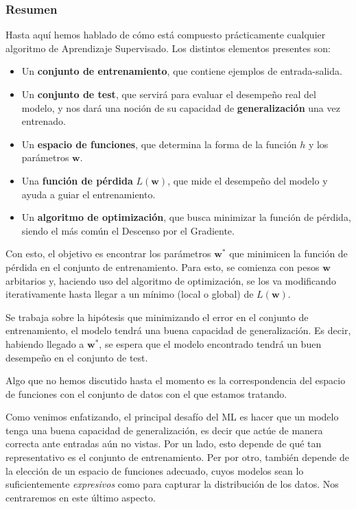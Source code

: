 \documentclass[../../main.tex]{subfiles}
\begin{document}
\subsubsection{Resumen}
Hasta aquí hemos hablado de cómo está compuesto prácticamente cualquier algoritmo de
Aprendizaje Supervisado. Los distintos elementos presentes son:
\begin{itemize}[noitemsep]
    \item Un \textbf{conjunto de entrenamiento}, que contiene ejemplos de entrada-salida.
    \item Un \textbf{conjunto de test}, que servirá para evaluar el desempeño real del modelo,
    y nos dará una noción de su capacidad de \textbf{generalización} una vez entrenado.
    \item Un \textbf{espacio de funciones}, que determina la forma de la función \(h\) y los
    parámetros \(\bm{w}\).
    \item Una \textbf{función de pérdida} \(L(\bm{w})\), que mide el desempeño del modelo
    y ayuda a guiar el entrenamiento.
    \item Un \textbf{algoritmo de optimización}, que busca minimizar la función de pérdida,
    siendo el más común el Descenso por el Gradiente.
\end{itemize}

Con esto, el objetivo es encontrar los parámetros \(\bm{w}^*\) que minimicen la función de
pérdida en el conjunto de entrenamiento. Para esto, se comienza con pesos \(\bm{w}\)
arbitarios y, haciendo uso del algoritmo de optimización, se los va modificando iterativamente
hasta llegar a un mínimo (local o global) de \(L(\bm{w})\).

Se trabaja sobre la hipótesis que minimizando el error en el conjunto de entrenamiento, el
modelo tendrá una buena capacidad de generalización. Es decir, habiendo llegado a
\(\bm{w}^*\), se espera que el modelo encontrado tendrá un buen desempeño en el
conjunto de test.

\bigskip
Algo que no hemos discutido hasta el momento es la correspondencia del espacio de
funciones con el conjunto de datos con el que estamos tratando.

Como venimos enfatizando, el principal desafío del ML es hacer que un modelo tenga una
buena capacidad de generalización, es decir que actúe de manera correcta ante entradas aún
no vistas. Por un lado, esto depende de qué tan representativo es el conjunto de
entrenamiento. Per por otro, también depende de la elección de un espacio de
funciones adecuado, cuyos modelos sean lo suficientemente \textit{expresivos} como para
capturar la distribución de los datos. Nos centraremos en este último aspecto.
\end{document}
